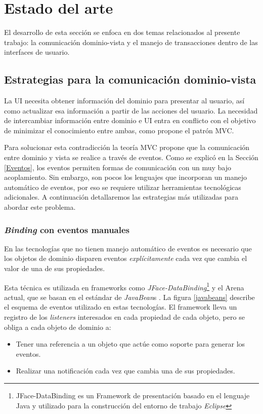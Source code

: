 \section{Estado del arte}
\label{StateOfTheArt}
El desarrollo de esta sección se enfoca en dos temas relacionados al
presente trabajo: la comunicación dominio-vista y el manejo de transacciones
dentro de las interfaces de usuario.

\subsection{Estrategias para la comunicación dominio-vista}
La UI necesita obtener información del dominio para presentar
al usuario, así como actualizar esa información a partir de las acciones del usuario.
La necesidad de intercambiar información entre dominio e UI
entra en conflicto con el objetivo de minimizar el conocimiento entre ambas,
como propone el patrón MVC.

Para solucionar esta contradicción la teoría MVC propone que la
comunicación entre dominio y vista se realice a través de eventos. 
Como se explicó en la Sección \ref{Eventos}, los eventos
permiten formas de comunicación con un muy bajo acoplamiento. 
Sin embargo, son pocos los lenguajes que incorporan un manejo automático de
eventos, por eso se requiere utilizar herramientas tecnológicas adicionales.
A continuación detallaremos las estrategias más utilizadas para abordar este
problema.

\subsubsection{\emph{Binding} con eventos manuales}
	En las tecnologías que no tienen manejo automático de eventos es necesario que
	los objetos de dominio disparen eventos \emph{explícitamente} cada vez que cambia el valor de una de sus propiedades.
	
	Esta técnica es utilizada en
	frameworks como \emph{JFace-DataBinding}\footnote{JFace-DataBinding es un
	Framework de presentación basado en el lenguaje Java y utilizado para la
	construcción del entorno de trabajo \emph{Eclipse}} y el Arena
	actual, que se basan en el estándar de
	\emph{JavaBean}s \cite{sousa00formal}.
	La figura \ref{javabeans} describe el esquema de eventos utilizado en estas
	tecnologías. El framework lleva un registro de los \emph{listeners}
	interesados en cada propiedad de cada objeto, pero se obliga a cada objeto de dominio a:
	\begin{itemize}
	  \item Tener una referencia a un objeto que actúe como soporte para generar
	  los eventos.
	  \item Realizar una notificación cada vez que cambia una de sus propiedades.
	\end{itemize} 

